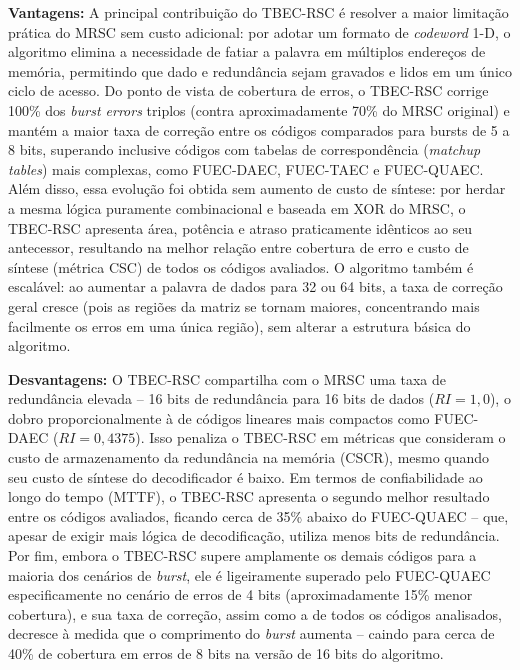 \documentclass[12pt,a4paper]{article}
\begin{document}
\textbf{Vantagens:} A principal contribuição do TBEC-RSC é resolver a maior 
limitação prática do MRSC sem custo adicional: por adotar um formato de 
\textit{codeword} 1-D, o algoritmo elimina a necessidade de fatiar a palavra 
em múltiplos endereços de memória, permitindo que dado e redundância sejam 
gravados e lidos em um único ciclo de acesso. Do ponto de vista de cobertura 
de erros, o TBEC-RSC corrige 100\% dos \textit{burst errors} triplos (contra 
aproximadamente 70\% do MRSC original) e mantém a maior taxa de correção 
entre os códigos comparados para bursts de 5 a 8 bits, superando inclusive 
códigos com tabelas de correspondência (\textit{matchup tables}) mais 
complexas, como FUEC-DAEC, FUEC-TAEC e FUEC-QUAEC. Além disso, essa evolução 
foi obtida sem aumento de custo de síntese: por herdar a mesma lógica 
puramente combinacional e baseada em XOR do MRSC, o TBEC-RSC apresenta área, 
potência e atraso praticamente idênticos ao seu antecessor, resultando na 
melhor relação entre cobertura de erro e custo de síntese (métrica CSC) de 
todos os códigos avaliados. O algoritmo também é escalável: ao aumentar a 
palavra de dados para 32 ou 64 bits, a taxa de correção geral cresce (pois 
as regiões da matriz se tornam maiores, concentrando mais facilmente os 
erros em uma única região), sem alterar a estrutura básica do algoritmo.

\textbf{Desvantagens:} O TBEC-RSC compartilha com o MRSC uma taxa de 
redundância elevada -- 16 bits de redundância para 16 bits de dados 
($RI=1{,}0$), o dobro proporcionalmente à de códigos lineares mais compactos 
como FUEC-DAEC ($RI=0{,}4375$). Isso penaliza o TBEC-RSC em métricas que 
consideram o custo de armazenamento da redundância na memória (CSCR), mesmo 
quando seu custo de síntese do decodificador é baixo. Em termos de 
confiabilidade ao longo do tempo (MTTF), o TBEC-RSC apresenta o segundo 
melhor resultado entre os códigos avaliados, ficando cerca de 35\% abaixo do 
FUEC-QUAEC -- que, apesar de exigir mais lógica de decodificação, utiliza 
menos bits de redundância. Por fim, embora o TBEC-RSC supere amplamente os 
demais códigos para a maioria dos cenários de \textit{burst}, ele é 
ligeiramente superado pelo FUEC-QUAEC especificamente no cenário de erros de 
4 bits (aproximadamente 15\% menor cobertura), e sua taxa de correção, assim 
como a de todos os códigos analisados, decresce à medida que o comprimento 
do \textit{burst} aumenta -- caindo para cerca de 40\% de cobertura em 
erros de 8 bits na versão de 16 bits do algoritmo.
\end{document}
